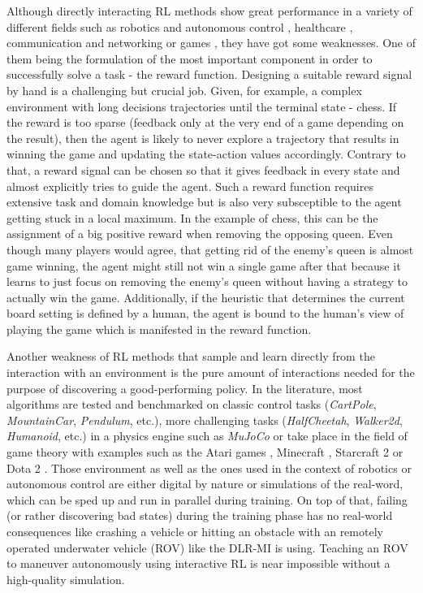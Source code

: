 Although directly interacting RL methods show great performance in a variety of different fields such as robotics and autonomous control \cite[]{etemad2020using, patil2021deep, wang2018reinforcement}, healthcare \cite[]{tseng2017deep, yu2019incorporating},  communication and networking \cite[]{chinchali2018cellular, fadlullah2017state}  or games \cite[]{berner2019dota, mnih2013playing, wu2016training}, they have got some weaknesses. One of them being the formulation of the most important component in order to successfully solve a task - the reward function. Designing a suitable reward signal by hand is a challenging but crucial job. Given, for example, a complex environment with long decisions trajectories until the terminal state - chess. If the reward is too sparse (feedback only at the very end of a game depending on the result), then the agent is likely to never explore a trajectory that results in winning the game and updating the state-action values accordingly. Contrary to that, a reward signal can be chosen so that it gives feedback in every state and almost explicitly tries to guide the agent. Such a reward function requires extensive task and domain knowledge but is also very subsceptible to the agent getting stuck in a local maximum. In the example of chess, this can be the assignment of a big positive reward when removing the opposing queen. Even though many players would agree, that getting rid of the enemy's queen is almost game winning, the agent might still not win a single game after that because it learns to just focus on removing the enemy's queen without having a strategy to actually win the game. Additionally, if the heuristic that determines the current board setting is defined by a human, the agent is bound to the human's view of playing the game which is manifested in the reward function. 
\par
Another weakness of RL methods that sample and learn directly from the interaction with an environment is the pure amount of interactions needed for the purpose of discovering a good-performing policy. In the literature, most algorithms are tested and benchmarked on classic control tasks (\textit{CartPole}, \textit{MountainCar}, \textit{Pendulum}, etc.), more challenging tasks (\textit{HalfCheetah}, \textit{Walker2d}, \textit{Humanoid}, etc.) in a physics engine such as \textit{MuJoCo} \cite[]{todorov2012mujoco} or take place in the field of game theory with examples such as the Atari games \cite[]{mnih2013playing}, Minecraft \cite[]{johnson2016malmo}, Starcraft 2 \cite[]{vinyals2019grandmaster} or Dota 2 \cite[]{berner2019dota}. Those environment as well as the ones used in the context of robotics or autonomous control are either digital by nature or simulations of the real-word, which can be sped up and run in parallel during training. On top of that, failing (or rather discovering bad states) during the training phase has no real-world consequences like crashing a vehicle or hitting an obstacle with an remotely operated underwater vehicle (ROV) like the DLR-MI is using. Teaching an ROV to maneuver autonomously using interactive RL is near impossible without a high-quality simulation.
